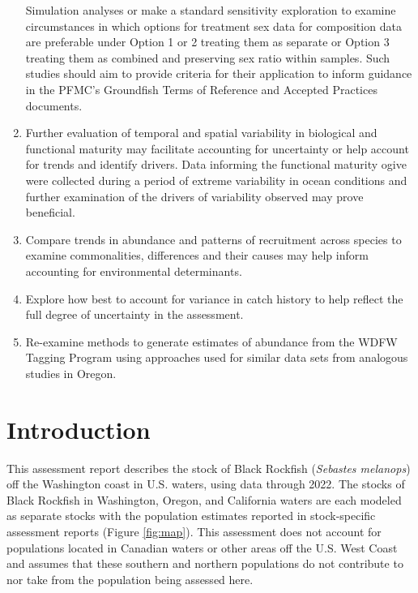 \documentclass[11pt,
  letterpaper,
]{article}
\begin{document}
\begin{enumerate}
  Simulation analyses or make a standard sensitivity exploration to examine circumstances in which options for treatment sex data for composition data are preferable under Option 1 or 2 treating them as separate or Option 3 treating them as combined and preserving sex ratio within samples. Such studies should aim to provide criteria for their application to inform guidance in the PFMC's Groundfish Terms of Reference and Accepted Practices documents.
\item
  Further evaluation of temporal and spatial variability in biological and functional maturity may facilitate accounting for uncertainty or help account for trends and identify drivers. Data informing the functional maturity ogive were collected during a period of extreme variability in ocean conditions and further examination of the drivers of variability observed may prove beneficial.
\item
  Compare trends in abundance and patterns of recruitment across species to examine commonalities, differences and their causes may help inform accounting for environmental determinants.
\item
  Explore how best to account for variance in catch history to help reflect the full degree of uncertainty in the assessment.
\item
  Re-examine methods to generate estimates of abundance from the WDFW Tagging Program using approaches used for similar data sets from analogous studies in Oregon.
\end{enumerate}

\vspace{500cm}

\pagebreak
\setlength{\parskip}{5mm plus1mm minus1mm}
\setcounter{page}{1}
\renewcommand{\thefigure}{\arabic{figure}}
\renewcommand{\thetable}{\arabic{table}}
\setcounter{table}{0}
\setcounter{figure}{0}

\hypertarget{introduction}{%
\section{Introduction}\label{introduction}}

This assessment report describes the stock of Black Rockfish (\emph{Sebastes melanops}) off the Washington coast in U.S. waters, using data through 2022. The stocks of Black Rockfish in Washington, Oregon, and California waters are each modeled as separate stocks with the population estimates reported in stock-specific assessment reports (Figure \ref{fig:map}). This assessment does not account for populations located in Canadian waters or other areas off the U.S. West Coast and assumes that these southern and northern populations do not contribute to nor take from the population being assessed here.
\end{document}
